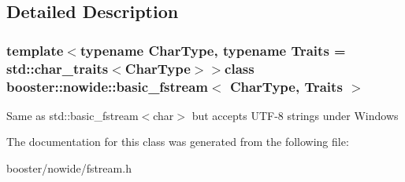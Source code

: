 \subsection{\-Detailed \-Description}
\subsubsection*{template$<$typename Char\-Type, typename Traits = std\-::char\-\_\-traits$<$\-Char\-Type$>$$>$class booster\-::nowide\-::basic\-\_\-fstream$<$ Char\-Type, Traits $>$}

\-Same as std\-::basic\-\_\-fstream$<$char$>$ but accepts \-U\-T\-F-\/8 strings under \-Windows 

\-The documentation for this class was generated from the following file\-:\begin{DoxyCompactItemize}
\item 
booster/nowide/fstream.\-h\end{DoxyCompactItemize}
